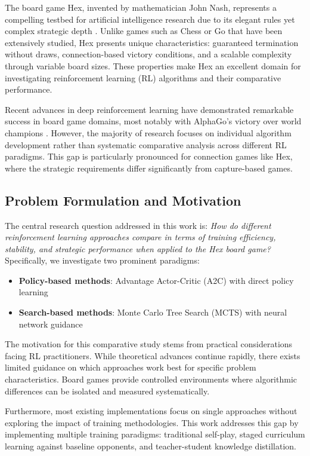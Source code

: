 \documentclass[conference]{IEEEtran}
\begin{document}
The board game Hex, invented by mathematician John Nash, represents a compelling testbed for artificial intelligence research due to its elegant rules yet complex strategic depth \cite{hex_original}. Unlike games such as Chess or Go that have been extensively studied, Hex presents unique characteristics: guaranteed termination without draws, connection-based victory conditions, and a scalable complexity through variable board sizes. These properties make Hex an excellent domain for investigating reinforcement learning (RL) algorithms and their comparative performance.

Recent advances in deep reinforcement learning have demonstrated remarkable success in board game domains, most notably with AlphaGo's victory over world champions \cite{alphago}. However, the majority of research focuses on individual algorithm development rather than systematic comparative analysis across different RL paradigms. This gap is particularly pronounced for connection games like Hex, where the strategic requirements differ significantly from capture-based games.

\subsection{Problem Formulation and Motivation}

The central research question addressed in this work is: \textit{How do different reinforcement learning approaches compare in terms of training efficiency, stability, and strategic performance when applied to the Hex board game?} Specifically, we investigate two prominent paradigms:

\begin{itemize}
\item \textbf{Policy-based methods}: Advantage Actor-Critic (A2C) with direct policy learning
\item \textbf{Search-based methods}: Monte Carlo Tree Search (MCTS) with neural network guidance
\end{itemize}

The motivation for this comparative study stems from practical considerations facing RL practitioners. While theoretical advances continue rapidly, there exists limited guidance on which approaches work best for specific problem characteristics. Board games provide controlled environments where algorithmic differences can be isolated and measured systematically.

Furthermore, most existing implementations focus on single approaches without exploring the impact of training methodologies. This work addresses this gap by implementing multiple training paradigms: traditional self-play, staged curriculum learning against baseline opponents, and teacher-student knowledge distillation.
\end{document}
